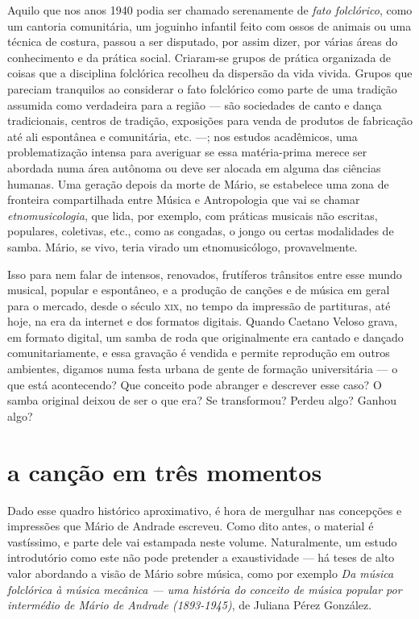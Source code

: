 Aquilo que nos anos 1940 podia ser chamado serenamente de \textit{fato
folclórico}, como um cantoria comunitária, um joguinho infantil feito
com ossos de animais ou uma técnica de costura, passou a ser disputado,
por assim dizer, por várias áreas do conhecimento e da prática social.
Criaram-se grupos de prática organizada de coisas que a disciplina
folclórica recolheu da dispersão da vida vivida. Grupos que pareciam
tranquilos ao considerar o fato folclórico como parte de uma tradição
assumida como verdadeira para a região --- são sociedades de canto e
dança tradicionais, centros de tradição, exposições para venda de
produtos de fabricação até ali espontânea e comunitária, etc. ---; nos
estudos acadêmicos, uma problematização intensa para averiguar se essa
matéria-prima merece ser abordada numa área autônoma ou deve ser alocada
em alguma das ciências humanas. Uma geração depois da morte de Mário, se
estabelece uma zona de fronteira compartilhada entre Música e
Antropologia que vai se chamar \textit{etnomusicologia}, que lida, por
exemplo, com práticas musicais não escritas, populares, coletivas, etc.,
como as congadas, o jongo ou certas modalidades de samba. Mário, se
vivo, teria virado um etnomusicólogo, provavelmente.

Isso para nem falar de intensos, renovados, frutíferos trânsitos entre
esse mundo musical, popular e espontâneo, e a produção de canções e de
música em geral para o mercado, desde o século \textsc{xix}, no tempo da impressão
de partituras, até hoje, na era da internet e dos formatos digitais.
Quando Caetano Veloso grava, em formato digital, um samba de roda que
originalmente era cantado e dançado comunitariamente, e essa gravação é
vendida e permite reprodução em outros ambientes, digamos numa festa
urbana de gente de formação universitária --- o que está acontecendo? Que
conceito pode abranger e descrever esse caso? O samba original deixou de
ser o que era? Se transformou? Perdeu algo? Ganhou algo?

\section{a canção em três momentos}

Dado esse quadro histórico aproximativo, é hora de mergulhar nas
concepções e impressões que Mário de Andrade escreveu. Como dito antes,
o material é vastíssimo, e parte dele vai estampada neste volume.
Naturalmente, um estudo introdutório como este não pode pretender a
exaustividade --- há teses de alto valor abordando a visão de Mário sobre
música, como por exemplo \textit{Da música folclórica à música mecânica ---
uma história do conceito de música popular por intermédio de Mário de
Andrade (1893-1945)}, de Juliana Pérez González.%

